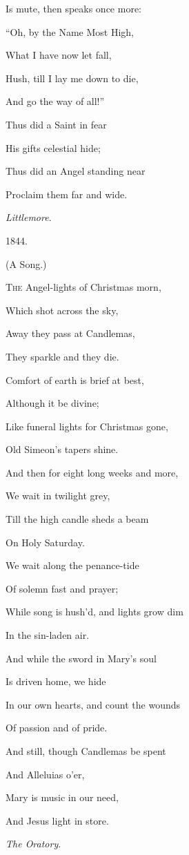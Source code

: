 Is mute, then
speaks once more:

``Oh, by the Name Most High,

What I have now let
fall,

Hush, till I lay me down to die,

And go the way of
all!'' 

Thus did a Saint in fear

His gifts celestial
hide;

Thus did an Angel standing near

Proclaim them far
and wide.

\emph{Littlemore}.

1844.


(A Song.)

T\textsc{he} Angel-lights of Christmas morn,

Which shot across the sky,

Away they pass at Candlemas,

They sparkle and they die.

Comfort of earth is brief at best,

Although it be divine;

Like funeral lights for Christmas gone,

Old Simeon's tapers shine.

And then for eight long weeks and more,

We wait in twilight grey,

Till the high candle sheds a beam

On Holy Saturday.

We wait along the penance-tide

Of solemn fast and prayer;

While song is hush'd, and lights grow dim

In the sin-laden air. 

And while the sword in Mary's soul

Is driven home, we hide

In our own hearts, and count the wounds

Of passion and of pride.

And still, though Candlemas be spent

And Alleluias o'er,

Mary is music in our need,

And Jesus light in store.

\emph{The Oratory}.

